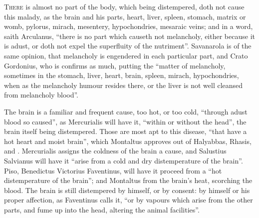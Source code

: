 \lettrine{T}{here} is almost no part of the body, which being distempered, doth
not cause this malady, as the brain and his parts, heart, liver, spleen,
stomach, matrix or womb, pylorus, mirach, mesentery, hypochondries, mesaraic
veins; and in a word, saith Arculanus, \enquote{there is no part
which causeth not melancholy, either because it is adust, or doth not expel the
superfluity of the nutriment}. Savanarola  is of the same opinion, that melancholy is
engendered in each particular part, and Crato
 Gordonius, who is
 confirms as
much, putting the \enquote{matter of melancholy, sometimes in the
stomach, liver, heart, brain, spleen, mirach, hypochondries, when as the
melancholy humour resides there, or the liver is not well cleansed from
melancholy blood}.

The brain is a familiar and frequent cause, too hot, or too cold,
\enquote{through adust blood so caused}, as Mercurialis will have
it, \enquote{within or without the head}, the brain itself being distempered. Those are
most apt to this disease, \enquote{that have a hot heart and moist
brain}, which Montaltus  approves
out of Halyabbas, Rhasis, and \Avicenna{}. Mercurialis
 assigns the coldness of the brain a cause,
and Salustius Salvianus 
will have it \enquote{arise from a cold and dry distemperature of
the brain}. Piso, Benedictus Victorius Faventinus, will have it proceed from a
\enquote{hot distemperature of the brain}; and
Montaltus  from the brain's
heat, scorching the blood. The brain is still distempered by himself, or by
consent: by himself or his proper affection, as Faventinus calls it,
\enquote{or by vapours which arise from the other parts, and fume
up into the head, altering the animal facilities}.

